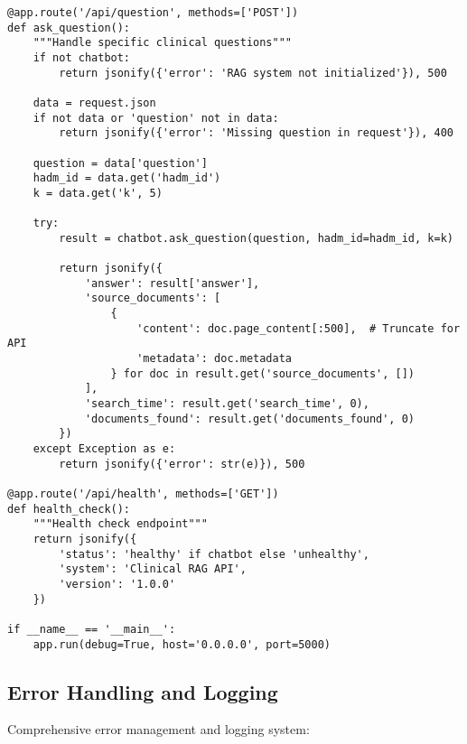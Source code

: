 \begin{verbatim}
@app.route('/api/question', methods=['POST'])
def ask_question():
    """Handle specific clinical questions"""
    if not chatbot:
        return jsonify({'error': 'RAG system not initialized'}), 500

    data = request.json
    if not data or 'question' not in data:
        return jsonify({'error': 'Missing question in request'}), 400

    question = data['question']
    hadm_id = data.get('hadm_id')
    k = data.get('k', 5)

    try:
        result = chatbot.ask_question(question, hadm_id=hadm_id, k=k)
        
        return jsonify({
            'answer': result['answer'],
            'source_documents': [
                {
                    'content': doc.page_content[:500],  # Truncate for API
                    'metadata': doc.metadata
                } for doc in result.get('source_documents', [])
            ],
            'search_time': result.get('search_time', 0),
            'documents_found': result.get('documents_found', 0)
        })
    except Exception as e:
        return jsonify({'error': str(e)}), 500

@app.route('/api/health', methods=['GET'])
def health_check():
    """Health check endpoint"""
    return jsonify({
        'status': 'healthy' if chatbot else 'unhealthy',
        'system': 'Clinical RAG API',
        'version': '1.0.0'
    })

if __name__ == '__main__':
    app.run(debug=True, host='0.0.0.0', port=5000)
\end{verbatim}

\subsection{Error Handling and Logging}

Comprehensive error management and logging system:


